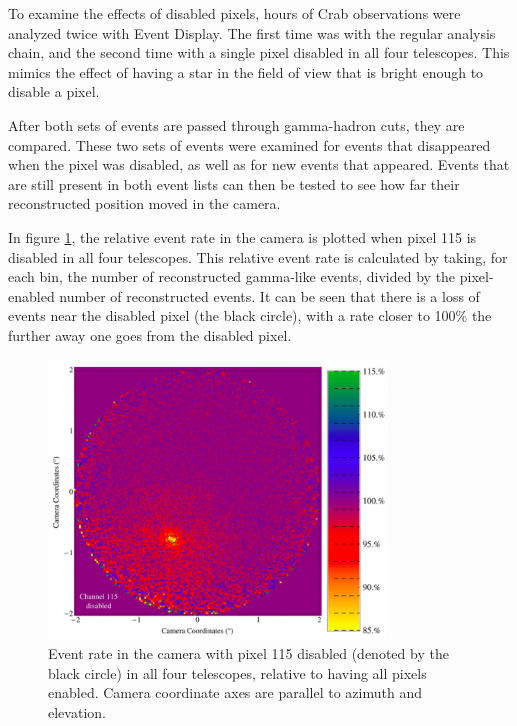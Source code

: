     To examine the effects of disabled pixels,  hours of Crab observations were analyzed twice with Event Display.
    The first time was with the regular analysis chain, and the second time with a single pixel disabled in all four telescopes.
    This mimics the effect of having a star in the field of view that is bright enough to disable a pixel.

    After both sets of events are passed through gamma-hadron cuts, they are compared.
    These two sets of events were examined for events that disappeared when the pixel was disabled, as well as for new events that appeared.
    Events that are still present in both event lists can then be tested to see how far their reconstructed position moved in the camera.

    In figure \ref{fig:dpix_rel_camera}, the relative event rate in the camera is plotted when pixel 115 is disabled in all four telescopes.
    This relative event rate is calculated by taking, for each bin, the number of reconstructed gamma-like events, divided by the pixel-enabled number of reconstructed events.
    It can be seen that there is a loss of events near the disabled pixel (the black circle), with a rate closer to 100\% the further away one goes from the disabled pixel.

    \begin{figure}[ht]
      \begin{center}
        \includegraphics[width=0.8\textwidth]{images/disabled_pixel/relativerate_camera}
        \caption[Relative Event Rate]{Event rate in the camera with pixel 115 disabled (denoted by the black circle) in all four telescopes, relative to having all pixels enabled.  Camera coordinate axes are parallel to azimuth and elevation.}\label{fig:dpix_rel_camera}
      \end{center}
    \end{figure}

